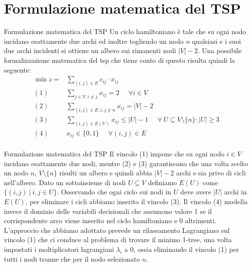 \documentclass[10pt]{beamer}
\begin{document}
\section{Formulazione matematica del TSP}
\begin{frame}{Formulazione matematica del TSP}
    Un ciclo hamiltoniano è tale che su ogni nodo incidano esattamente due archi ed inoltre togliendo un nodo $n$ qualsiasi e i suoi due archi incidenti si ottiene un albero sui rimanenti nodi $|V| - 2$. Una possibile formalizzazione matematica del tsp che tiene conto di questo risulta quindi la seguente:
    \begin{equation*}
      \begin{split}
        \min z = & \sum_{(i,j) \in E} c_{ij} \cdot x_{ij}\\
        (1)\:\:\:\:\:\: & \sum_{j \in V, i \neq j} x_{ij} = 2 \:\:\:\:\:\: \forall i \in V \\
        (2) \:\:\:\:\:\: & \sum_{(i,j)\in E, i, j \neq n} x_{ij} = |V|-2 \\
        (3) \:\:\:\:\:\: & \sum_{(i,j) \in E(U)} x_{ij} \leq |U| - 1 \:\:\:\:\:\: \forall\: U \subseteq V\setminus\{n\} : |U| \geq 3 \\
        (4) \:\:\:\:\:\: & x_{ij} \in \{0,1\} \:\:\:\:\:\: \forall (i,j) \in E\\
      \end{split}
    \end{equation*}
\end{frame}

\begin{frame}{Formulazione matematica del TSP}
    Il vincolo (1) impone che su ogni nodo $i \in V$ incidano esattamente due nodi, mentre (2) e (3) garantiscono che una volta scelto un nodo $n$, $V \setminus \{n\}$ risulti un albero e quindi abbia $|V|-2$ archi e sia privo di cicli nell'albero. 
    Dato un sottoinsieme di nodi $U \subseteq V$ definiamo $E(U)$ come $\{ (i,j) \:|\: i,j \in U \}$. Osservando che ogni ciclo sui nodi in $U$ deve avere $|U|$ archi in $E(U)$, per eliminare i cicli abbiamo inserito il vincolo (3). Il vincolo (4) modella invece il dominio delle variabili decisionali che assumono valore 1 se il corrispondente arco viene inserito nel ciclo hamiltoniano e 0 altrimenti.
    \newline
    \newline
    L'approccio che abbiamo adottato prevede un rilassamento Lagrangiano sul vincolo (1) che ci conduce al problema di trovare il minimo 1-tree, una volta impostati i moltiplicatori lagrangiani $\lambda_i$ a 0, ossia eliminando il vincolo (1) per tutti i nodi tranne che per il nodo selezionato $n$.
\end{frame}
\end{document}
